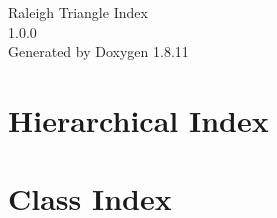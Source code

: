 \documentclass[twoside]{book}
\newcommand{\+}{\discretionary{\mbox{\scriptsize$\hookleftarrow$}}{}{}}
\newcommand{\clearemptydoublepage}{%
  \newpage{\pagestyle{empty}\cleardoublepage}%
}
\begin{document}
\begin{titlepage}
\vspace*{7cm}
\begin{center}%
{\Large Raleigh Triangle Index \\[1ex]\large 1.\+0.\+0 }\\
\vspace*{1cm}
{\large Generated by Doxygen 1.8.11}\\
\end{center}
\end{titlepage}
\clearemptydoublepage
\tableofcontents
\clearemptydoublepage
{}

\chapter{Hierarchical Index}

\chapter{Class Index}

\end{document}
